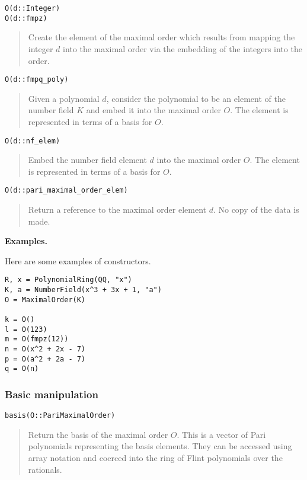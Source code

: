 \documentclass[a4paper,10pt]{article}
\newcommand{\desc}[1]{\vspace{-3mm}\begin{quote}#1\end{quote}}
\begin{document}
{{\begin{lstlisting}
O(d::Integer)
O(d::fmpz)
\end{lstlisting}

\desc{Create the element of the maximal order which results from mapping the
integer $d$ into the maximal order via the embedding of the integers into the
order.}

\begin{lstlisting}
O(d::fmpq_poly)
\end{lstlisting}

\desc{Given a polynomial $d$, consider the polynomial to be an element of the
number field $K$ and embed it into the maximal order $O$. The element is
represented in terms of a basis for $O$.}

\begin{lstlisting}
O(d::nf_elem)
\end{lstlisting}

\desc{Embed the number field element $d$ into the maximal order $O$. The element
is represented in terms of a basis for $O$.}

\begin{lstlisting}
O(d::pari_maximal_order_elem)
\end{lstlisting}

\desc{Return a reference to the maximal order element $d$. No copy of the data is
made.}

\textbf{Examples.}

Here are some examples of constructors.

\begin{lstlisting}
R, x = PolynomialRing(QQ, "x")
K, a = NumberField(x^3 + 3x + 1, "a")
O = MaximalOrder(K)

k = O()
l = O(123)
m = O(fmpz(12))
n = O(x^2 + 2x - 7)
p = O(a^2 + 2a - 7)
q = O(n)
\end{lstlisting}

\subsubsection{Basic manipulation}

\begin{lstlisting}
basis(O::PariMaximalOrder)
\end{lstlisting}

\desc{Return the basis of the maximal order $O$. This is a vector of Pari
polynomials representing the basis elements. They can be accessed using
array notation and coerced into the ring of Flint polynomials over the
rationals.}

}}
\end{document}
